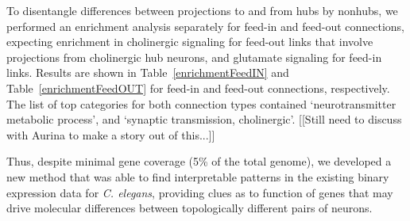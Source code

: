 \documentclass[10pt,letterpaper]{article}
\newlength\savedwidth
\newcommand\thickhline{\noalign{\global\savedwidth\arrayrulewidth\global\arrayrulewidth 2pt}%
\hline
\noalign{\global\arrayrulewidth\savedwidth}}
\begin{document}
To disentangle differences between projections to and from hubs by nonhubs, we performed an enrichment analysis separately for feed-in and feed-out connections, expecting enrichment in cholinergic signaling for feed-out links that involve projections from cholinergic hub neurons, and glutamate signaling for feed-in links.
Results are shown in Table~\ref{enrichmentFeedIN} and Table~\ref{enrichmentFeedOUT} for feed-in and feed-out connections, respectively.
The list of top categories for both connection types contained `neurotransmitter metabolic process', and `synaptic transmission, cholinergic'.
[[Still need to discuss with Aurina to make a story out of this...]]


Thus, despite minimal gene coverage (5\% of the total genome), we developed a new method that was able to find interpretable patterns in the existing binary expression data for \emph{C. elegans}, providing clues as to function of genes that may drive molecular differences between topologically different pairs of neurons.


\end{document}
